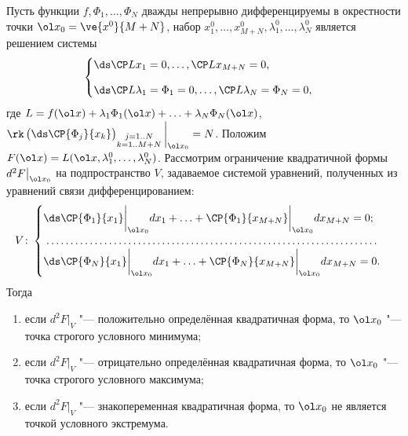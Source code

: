 \label{LEN}
Пусть функции \(f,\Phi_1,\ldots,\Phi_N\) дважды непрерывно дифференцируемы в окрестности точки \(\ol x_0 = \ve{x^0}{M+N}\), набор \(x_1^0,\ldots,x_{M+N}^0,\lambda_1^0,\ldots,\lambda_N^0\) является
решением системы
\[\begin{cases}
\ds\CP L{x_1} = 0, \ldots, \CP L{x_{M+N}}=0, \\[2ex]
\ds\CP L{\lambda_1}=\Phi_1=0, \ldots, \CP L{\lambda_N}=\Phi_N=0,
\end{cases}\]
где \(L = f(\ol x)+\lambda_1\Phi_1(\ol x)+\ldots+\lambda_N\Phi_N(\ol x)\), \(\rk
\begin{pmatrix}
\ds\CP{\Phi_j}{x_k}
\end{pmatrix}_{\substack{j=1..N \\ k=1..M+N}}\bigg|_{\ol x_0} = N\).
Положим \(F(\ol x) = L(\ol x,\lambda_1^0,\ldots,\lambda_N^0)\). Рассмотрим ограничение квадратичной формы \(d^2F\big|_{\ol x_0}\) на подпространство \(V\), задаваемое системой уравнений,
полученных из уравнений связи дифференцированием:
\[V\colon\begin{cases}
\ds\CP{\Phi_1}{x_1}\bigg|_{\ol x_0}dx_1 + \ldots + \CP{\Phi_1}{x_{M+N}}\bigg|_{\ol x_0}dx_{M+N}=0;\\
\dotfill\\
\ds\CP{\Phi_N}{x_1}\bigg|_{\ol x_0}dx_1 + \ldots + \CP{\Phi_N}{x_{M+N}}\bigg|_{\ol x_0}dx_{M+N}=0.
\end{cases}\]
Тогда
\begin{enumerate}\renewcommand{\labelenumi}{\arabic{enumi})}
\item если \(d^2F\big|_V\) "--- положительно определённая квадратичная форма, то \(\ol x_0\) "--- точка строгого условного минимума;
\item если \(d^2F\big|_V\) "--- отрицательно определённая квадратичная форма, то \(\ol x_0\) "--- точка строгого условного максимума;
\item если \(d^2F\big|_V\) "--- знакопеременная квадратичная форма, то \(\ol x_0\) не является точкой условного экстремума.
\end{enumerate}
